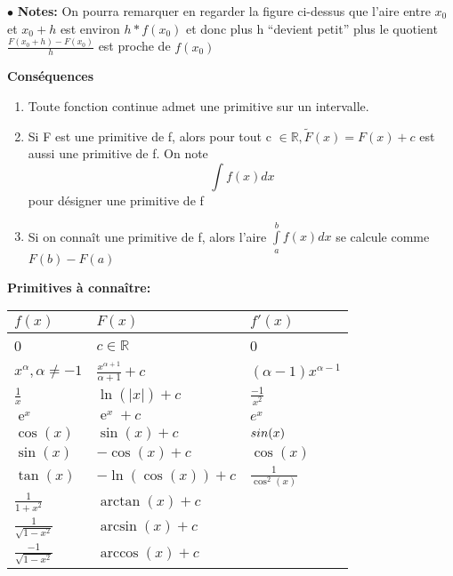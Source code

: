 \documentclass[a4paper]{article}
\theoremstyle{break}
\DeclareMathOperator{\e}{e} %
\newcommand{\R}{\mathbb{R}}
\newcommand{\note}{$\bullet$ \textbf{Notes: }}
\begin{document}
\note On pourra remarquer en regarder la figure ci-dessus que l'aire
entre $x_0$ et $x_0+h$ est environ $h*f(x_0)$ et donc plus h ``devient
petit'' plus le quotient $\frac{F(x_0+h) - F(x_0)}{h}$ est proche de
$f(x_0)$

\textbf{Conséquences}
\begin{enumerate}[label=(\alph*)]
\item Toute fonction continue admet une primitive sur un intervalle.
\item Si F est une primitive de f, alors pour tout c $\in \R,
  \tilde{F}(x) = F(x) + c$ est aussi une primitive de f. On note
  \[
    \int f(x) dx
  \]
  pour désigner une primitive de f
\item Si on connaît une primitive de f, alors l'aire $\int \limits_a^b
  f(x) dx$ se calcule comme $F(b) - F(a)$
\end{enumerate}

\textbf{Primitives à connaître: }
\begin{center}
\renewcommand{\arraystretch}{3} %
  \begin{tabular}{|l|C{2.5cm}|C{2.5cm}|}
    \hline
    $f(x)$ & $F(x)$ & $f'(x)$\\
     & $c \in \R$ & 0\\
    \hline
    $x^{\alpha}, \alpha \neq -1 $ & $\frac{x^{\alpha+1}}{\alpha+1} + c $
                                  & $ (\alpha-1)x^{\alpha-1}$  \\
    \hline
    $\frac{1}{x}$ & $\ln(|x|) + c $ & $ \frac{-1}{x^2}$ \\
    \hline
    $\e^x$ & $\e^x + c$ & $e^x$ \\
    \hline
    $\cos(x)$ & $\sin(x) + c$ & $\-sin(x)$ \\
    \hline
    $\sin(x)$ & $-\cos(x) + c$ & $\cos(x)$ \\
    \hline
    $\tan(x)$ & $-\ln(\cos(x)) + c$ & $\frac{1}{\cos^2(x)}$\\
    \hline
    $\frac{1}{1+x^2}$ & $\arctan(x) + c$ &\\
    \hline
    $\frac{1}{\sqrt{1-x^2}}$ & $\arcsin(x) + c$ &\\
    \hline
    $\frac{-1}{\sqrt{1-x^2}}$ & $\arccos(x) + c$ &\\
    \hline
  \end{tabular}
\end{center}
\end{document}
